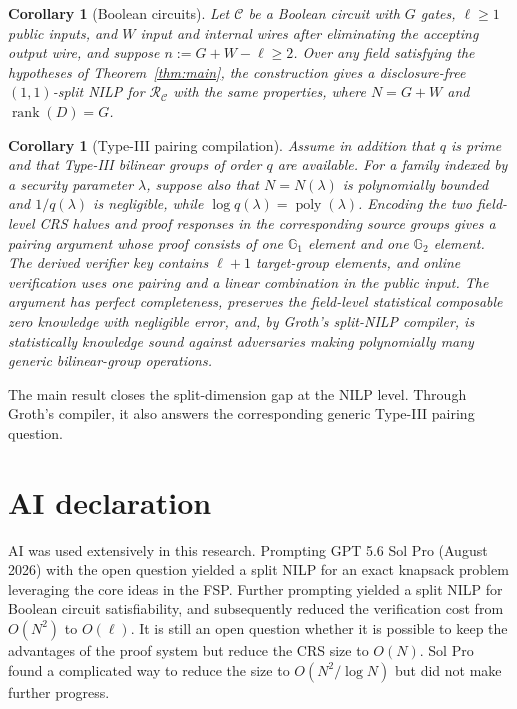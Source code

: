 \documentclass[11pt]{article}
\newtheorem{corollary}[theorem]{Corollary}
\theoremstyle{definition}
\newcommand{\Gone}{\mathbb G_1}
\newcommand{\Gtwo}{\mathbb G_2}
\newcommand{\cC}{\mathcal C}
\newcommand{\cR}{\mathcal R}
\begin{document}
\begin{corollary}[Boolean circuits]
Let $\cC$ be a Boolean circuit with $G$ gates, $\ell\ge1$ public inputs, and
$W$ input and internal wires after eliminating the accepting output wire, and
suppose $n:=G+W-\ell\ge2$.  Over any field satisfying the hypotheses of
Theorem~\ref{thm:main}, the construction gives a disclosure-free $(1,1)$-split
NILP for $\cR_{\cC}$ with the same properties, where $N=G+W$ and
$\operatorname{rank}(D)=G$.
\end{corollary}

\begin{corollary}[Type-III pairing compilation]
\label{cor:pairing-compilation}
Assume in addition that $q$ is prime and that Type-III bilinear groups of
order $q$ are available.  For a family indexed by a security parameter
$\lambda$, suppose also that $N=N(\lambda)$ is polynomially bounded and
$1/q(\lambda)$ is negligible, while
$\log q(\lambda)=\operatorname{poly}(\lambda)$.  Encoding the two field-level
CRS halves and proof responses in the corresponding source groups gives a
pairing argument whose proof consists of one $\Gone$ element and one $\Gtwo$ element.
The derived verifier key contains $\ell+1$ target-group elements, and online
verification uses one pairing and a linear combination in the public input.
The argument has perfect completeness, preserves the field-level statistical
composable zero knowledge with negligible error, and, by Groth's split-NILP
compiler, is statistically knowledge sound against adversaries making
polynomially many generic bilinear-group operations.
\end{corollary}

The main result closes the split-dimension gap at the NILP level.  Through
Groth's compiler, it also answers the corresponding generic Type-III pairing
question.

\section*{AI declaration}
AI was used extensively in this research. Prompting GPT 5.6 Sol Pro (August 2026) with the open question yielded a split NILP for an exact knapsack problem leveraging the core ideas in the FSP. Further prompting yielded a split NILP for Boolean circuit satisfiability, and subsequently reduced the verification cost from $O(N^2)$ to $O(\ell)$. It is still an open question whether it is possible to keep the advantages of the proof system but reduce the CRS size to $O(N)$. Sol Pro found a complicated way to reduce the size to $O(N^2/\log N)$ but did not make further progress.
\end{document}
